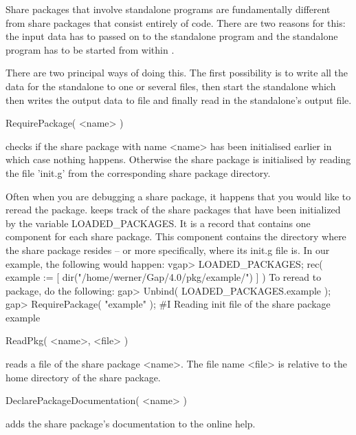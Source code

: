 

Share  packages  that    involve standalone  programs  are  fundamentally
different from  share packages  that  consist entirely of  {\GAP}  code.
There are two reasons  for this: the  input data has  to passed on to the
standalone  program and the standalone   program  has to be started  from
within {\GAP}.

There are two principal ways of doing this.  The first possibility is to
write all the data for the standalone to one or several files, then start
the standalone which then writes the output data to file and finally read
in the standalone's output file.  


\>RequirePackage( <name> )

checks if the share package with name <name> has been initialised earlier
in  which   case  nothing  happens.   Otherwise    the share   package is
initialised  by reading the file  'init.g'  from the corresponding  share
package directory.

Often when you are debugging  a share package, it  happens that you would
like to  reread the package.  {\GAP}  keeps  track of  the share packages
that have been  initialized by  the variable  LOADED_PACKAGES.   It is  a
record   that   contains one component for    each   share package.  This
component  contains the directory where the  share package  resides -- or
more specifically, where its  init.g    file is.   In our example,    the
following would happen:
\begintt
vgap> LOADED_PACKAGES;
rec(
  example := [ dir("/home/werner/Gap/4.0/pkg/example/") ] )
\endtt
To reread to package, do the following:
\begintt
gap> Unbind( LOADED_PACKAGES.example ); 
gap> RequirePackage( "example" );
#I  Reading init file of the share package example
\endtt

\>ReadPkg( <name>, <file> )

reads a file of the share package <name>.  The file name <file> is
relative to the home directory of the share package.

\>DeclarePackageDocumentation( <name> )

adds the share package's documentation to the online help.

